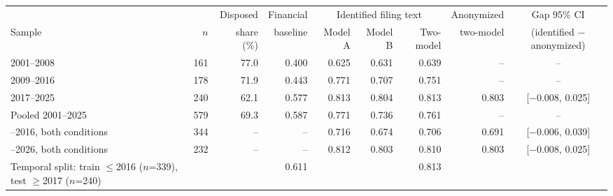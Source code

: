 \begin{tabular}{lrrrrrrrc}
\toprule
 & & Disposed & Financial & \multicolumn{3}{c}{Identified filing text} & Anonymized & Gap 95\% CI \\
\cmidrule(lr){5-7}
Sample & $n$ & share (\%) & baseline & Model A & Model B & Two-model & two-model & (identified $-$ anonymized) \\
\midrule
2001--2008 & 161 & 77.0 & 0.400 & 0.625 & 0.631 & 0.639 & -- & -- \\
2009--2016 & 178 & 71.9 & 0.443 & 0.771 & 0.707 & 0.751 & -- & -- \\
2017--2025 & 240 & 62.1 & 0.577 & 0.813 & 0.804 & 0.813 & 0.803 & [$-$0.008, 0.025] \\
Pooled 2001--2025 & 579 & 69.3 & 0.587 & 0.771 & 0.736 & 0.761 & -- & -- \\
\quad 2001--2016, both conditions & 344 & -- & -- & 0.716 & 0.674 & 0.706 & 0.691 & [$-$0.006, 0.039] \\
\quad 2017--2026, both conditions & 232 & -- & -- & 0.812 & 0.803 & 0.810 & 0.803 & [$-$0.008, 0.025] \\
\midrule
Temporal split: train $\le$2016 ($n$=339), test $\ge$2017 ($n$=240) & & & 0.611 & & & 0.813 & & \\
\bottomrule
\end{tabular}
